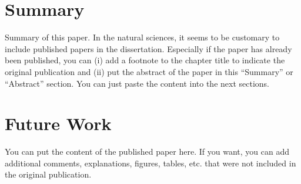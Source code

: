 \section{Summary}
Summary of this paper. In the natural sciences, it seems to be customary to include published papers in the dissertation. Especially if the paper has already been published, you can (i) add a footnote to the chapter title to indicate the original publication and (ii) put the abstract of the paper in this ``Summary'' or ``Abstract'' section. You can just paste the content into the next sections.

\section{Future Work}
You can put the content of the published paper here. If you want, you can add additional comments, explanations, figures, tables, etc. that were not included in the original publication.